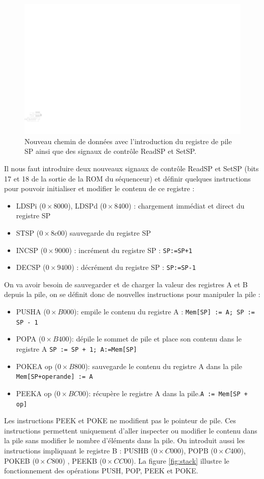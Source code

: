 \begin{figure}[htbp]
\includegraphics[width=\linewidth]{Figs/premier_chemin_seq_sp.pdf}
\caption{\label{fig:chemin_seq_sp}Nouveau chemin de données avec l'introduction du registre de pile SP ainsi que des signaux de contrôle ReadSP et SetSP.}
\end{figure}

Il nous faut introduire deux nouveaux signaux de contrôle ReadSP et SetSP (bits 17 et 18 de la sortie de la ROM du séquenceur) et définir quelques instructions pour pouvoir initialiser et modifier le contenu de ce registre :
\begin{itemize}
\item LDSPi ($0\times8000$), LDSPd ($0\times8400$)  : chargement immédiat et direct du registre SP
\item STSP ($0\times8c00$) sauvegarde du registre SP
\item INCSP ($0\times9000$) : incrément du registre SP : \texttt{SP:=SP+1} 
\item DECSP ($0\times9400$) : décrément du registre SP : \texttt{SP:=SP-1}
\end{itemize}

On va avoir besoin de sauvegarder et de charger la valeur des registres A et B depuis la pile, on se définit donc de nouvelles instructions pour manipuler la pile :
\begin{itemize}
\item PUSHA ($0\times B000$): empile le contenu du registre A : \texttt{Mem[SP] := A; SP := SP - 1}
\item POPA ($0\times B400$): dépile le sommet de pile et place son contenu dans le registre A \texttt{SP := SP + 1; A:=Mem[SP]}
\item POKEA op ($0\times B800$): sauvegarde le contenu du registre A dans la pile \texttt{Mem[SP+operande] := A}
\item PEEKA op ($0\times BC00$): récupère le registre A dans la pile.\texttt{A := Mem[SP + op]}
\end{itemize}
Les instructions PEEK et POKE ne modifient pas le pointeur de pile. Ces instructions permettent uniquement d'aller inspecter ou modifier le contenu dans la pile sans modifier le nombre d'éléments dans la pile. On introduit aussi les instructions impliquant le registre B : PUSHB ($0\times C000$), POPB ($0\times C400$), POKEB ($0\times C800$) , PEEKB ($0\times CC00$). La figure \ref{fig:stack} illustre le fonctionnement des opérations PUSH, POP, PEEK et POKE.

